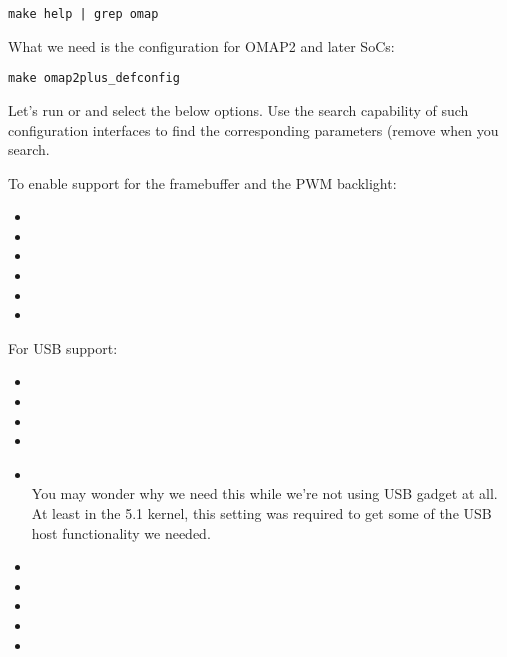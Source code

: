 \begin{verbatim}
make help | grep omap
\end{verbatim}

What we need is the configuration for OMAP2 and later SoCs:
\begin{verbatim}
make omap2plus_defconfig
\end{verbatim}

Let's run  or  and select the
below options. Use the search capability of such configuration
interfaces to find the corresponding parameters (remove 
when you search.

To enable support for the framebuffer and the PWM backlight:
\begin{itemize}
\item {}
\item {}
\item {}
\item {}
\item {}
\item {}
\end{itemize}

For USB support:
\begin{itemize}
\item {}
\item {}
\item {}
\item {}
\item {}\\
      You may wonder why we need this while we're not using USB gadget
      at all. At least in the 5.1 kernel, this setting was required to get some
      of the USB host functionality we needed.
\item {}
\item {}
\item {}
\item {}
\item {}
\end{itemize}

